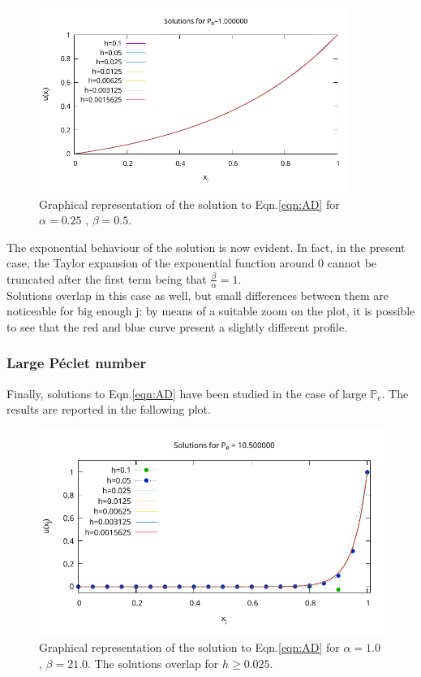 \documentclass[11pt]{article}
\theoremstyle{theorem}
\theoremstyle{definition}
\begin{document}
\begin{figure}[H]
	\begin{center}
		\includegraphics[width=0.9\textwidth]{ADRsol2.pdf}
	\end{center}
	\caption{Graphical representation of the solution to Eqn.\eqref{eqn:AD} for $\alpha=0.25$ , $\beta=0.5$.
		\label{fig:P_1}}
\end{figure}

The exponential behaviour of the solution is now evident. In fact, in the present case, the Taylor expansion of the exponential function around 0 cannot be truncated after the first term being that $\frac{\beta}{\alpha}=1$.\\
Solutions overlap in this case as well, but small differences between them are noticeable for big enough j: by means of a suitable zoom on the plot, it is possible to see that the red and blue curve present a slightly different profile.\\

\subsubsection{Large P\'{e}clet number}
Finally, solutions to Eqn.\eqref{eqn:AD} have been studied in the case of large $\mathbb{P}_e$. The results are reported in the following plot.

\begin{figure}[H]
	\begin{center}
		\includegraphics[width=1.0\textwidth]{ADRsol3.pdf}
	\end{center}
	\caption{Graphical representation of the solution to Eqn.\eqref{eqn:AD} for $\alpha=1.0$ , $\beta=21.0$. The solutions overlap for $h\ge 0.025$.
		\label{fig:P_10.5}}
\end{figure}
\end{document}
